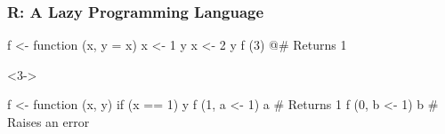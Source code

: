 \documentclass{beamer}
\begin{document}
\begin{frame}[fragile]
    \label{frame:Rlazy}
    \frametitle{R: A Lazy Programming Language}

\begin{Rcode}
f <- function (x, y = x) {
    x <- 1
    y
    x <- 2
    y
}
f (3)                               @\pause@# Returns 1
\end{Rcode}

\begin{overlayarea}{\textwidth}{3cm}
\begin{onlyenv}<3->
\begin{Rcode}
f <- function (x, y) if (x == 1) y
f (1, a <- 1)
a                                   # Returns 1
f (0, b <- 1)
b                                   # Raises an error
\end{Rcode}
\end{onlyenv}
\end{overlayarea}

\end{frame}

\frame{\questiontoc}
\end{document}
